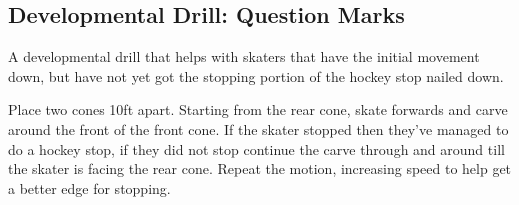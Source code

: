 \subsection*{Developmental Drill: Question Marks} 

A developmental drill that helps with skaters that have the initial movement down, but have not yet got the stopping portion of the hockey stop nailed down.      

Place two cones 10ft apart. 
Starting from the rear cone, skate forwards and carve around the front of the front cone.       
If the skater stopped then they've managed to do a hockey stop, if they did not stop continue the carve through and around till the skater is facing the rear cone. 
Repeat the motion, increasing speed to help get a better edge for stopping.


